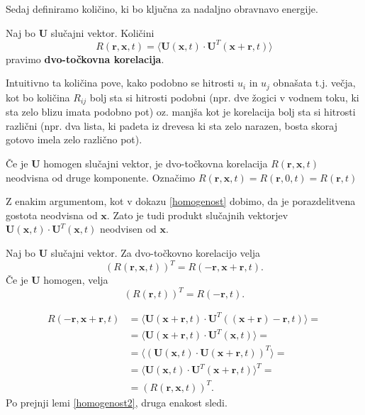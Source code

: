 \documentclass[mat2, tisk]{fmfdelo}
\newcommand{\bd}{\textbf}
\begin{document}
Sedaj definiramo količino, ki bo ključna za nadaljno obravnavo 
energije.

\begin{definicija}
Naj bo $\bd{U}$ slučajni vektor. Količini 
\begin{equation}
R(\bd{r}, \bd{x}, t) = \langle \bd{U}(\bd{x}, t)\cdot \bd{U}^T(\bd{x} + \bd{r}, t)\rangle
\end{equation}
pravimo \textbf{dvo-točkovna korelacija}.
\end{definicija}

Intuitivno ta količina pove, kako podobno se hitrosti $u_i$ in 
$u_j$ obnašata t.j. večja, kot bo količina $R_{ij}$ bolj sta si hitrosti 
podobni (npr. dve žogici v vodnem toku, ki sta zelo blizu imata podobno pot) oz. 
manjša kot je korelacija bolj sta si hitrosti različni (npr. dva lista, ki padeta 
iz drevesa ki sta zelo narazen, bosta skoraj gotovo imela zelo različno pot).

\begin{lema}
\label{homogenost2}
Če je $\bd{U}$ homogen slučajni vektor, je
dvo-točkovna korelacija $R(\bd{r}, \bd{x}, t)$ neodvisna od druge komponente.
Označimo $R(\bd{r}, \bd{x}, t) = R(\bd{r}, 0, t) = R(\bd{r}, t)$
\end{lema}

\begin{dokaz}
Z enakim argumentom, kot v dokazu \ref{homogenost} dobimo, da je 
porazdelitvena gostota neodvisna od $\bd{x}$. Zato je tudi produkt 
slučajnih vektorjev $\bd{U}(\bd{x}, t)\cdot \bd{U}^T(\bd{x}, t)$ neodvisen 
od $\bd{x}$.
\end{dokaz}

\begin{lema}
\label{dvo_točkovna_korelacija}
Naj bo $\bd{U}$ slučajni vektor. Za dvo-točkovno korelacijo velja 
\begin{equation}
(R(\bd{r}, \bd{x}, t))^T = R(-\bd{r}, \bd{x} + \bd{r}, t). 
\end{equation}
Če je $\bd{U}$ homogen, velja 
\begin{equation}
(R(\bd{r}, t))^T = R(-\bd{r}, t). 
\end{equation}
\end{lema}

\begin{dokaz}
\begin{align*}
  R(-\bd{r}, \bd{x} + \bd{r}, t) &= \langle \bd{U}(\bd{x} + \bd{r}, t)\cdot \bd{U}^T((\bd{x} + \bd{r}) - \bd{r}, t)\rangle = \\
  &= \langle \bd{U}(\bd{x} + \bd{r}, t)\cdot \bd{U}^T(\bd{x}, t)\rangle = \\
  &= \langle(\bd{U}(\bd{x}, t)\cdot \bd{U}(\bd{x} + \bd{r}, t))^T\rangle =\\
  &= \langle \bd{U}(\bd{x}, t)\cdot \bd{U}^T(\bd{x} + \bd{r}, t)\rangle^T =\\
  &= (R(\bd{r}, \bd{x}, t))^T.
\end{align*}  
Po prejnji lemi \ref{homogenost2}, druga enakost sledi.
\end{dokaz}
\end{document}
